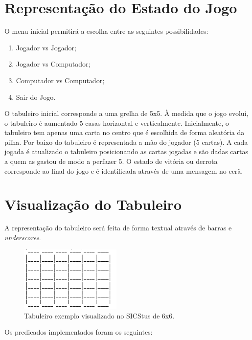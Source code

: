 \documentclass[a4paper]{article}
\begin{document}
\section{Representação do Estado do Jogo}

O menu inicial permitirá a escolha entre as seguintes possibilidades:

\begin{enumerate}
	\item Jogador vs Jogador;
	\item Jogador vs Computador;
	\item Computador vs Computador;
	\item Sair do Jogo. 
\end{enumerate}

\par
O tabuleiro inicial corresponde a uma grelha de 5x5. À medida que o jogo evolui, o tabuleiro é aumentado 5 casas horizontal e verticalmente. Inicialmente, o tabuleiro tem apenas uma carta no centro que é escolhida de forma aleatória da pilha. Por baixo do tabuleiro é representada a mão do jogador (5 cartas). A cada jogada é atualizado o tabuleiro posicionando as cartas jogadas e são dadas cartas a quem as gastou de modo a perfazer 5. O estado de vitória ou derrota corresponde ao final do jogo e é identificada através de uma mensagem no ecrã.

\section{Visualização do Tabuleiro}

A representação do tabuleiro será feita de forma textual através de barras e \textit{underscores}.

\begin{figure}[h!]
\centering
\includegraphics[width=50mm]{board.jpg}
\caption{Tabuleiro exemplo visualizado no SICStus de 6x6. \label{board}}
\end{figure}

Os predicados implementados foram os seguintes:
\end{document}
